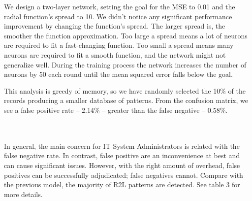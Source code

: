 \documentclass[twocolumn,11pt]{asme2ej}
\begin{document}
We design a two-layer network, setting the goal for the MSE to 0.01 and the radial function's spread to 10. We didn't notice any significant performance improvement by changing the function's spread. The larger spread is, the smoother the function approximation. Too large a spread means a lot of neurons are required to fit a fast-changing function. Too small a spread means many neurons are required to fit a smooth function, and the network might not generalize well. During the training process the network increases the number of neurons by 50 each round until the mean squared error falls below the goal.

This analysis is greedy of memory, so we have randomly selected the 10\% of the records producing a smaller database of  patterns. From the confusion matrix, we see a false positive rate -- 2.14\% -- greater than the false negative -- 0.58\%.

\smallskip\noindent
{}
\\\\

In general, the main concern for IT System Administrators is related with the false negative rate. In contrast, false positive are an inconvenience at best and can cause significant issues. However, with the right amount of overhead, false positives can be successfully adjudicated; false negatives cannot. Compare with the previous model, the majority of R2L patterns are detected. See table 3 for more details.
\end{document}
